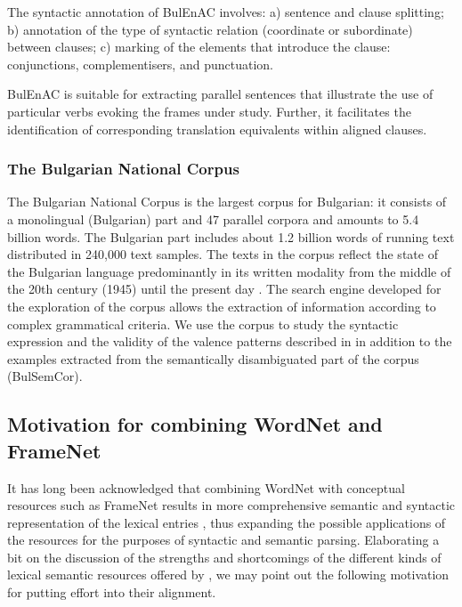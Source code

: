 \documentclass[output=paper,colorlinks,citecolor=brown]{langscibook}
\begin{document}
The syntactic annotation of BulEnAC involves:
a) sentence and clause splitting;
b) annotation of the type of syntactic relation (coordinate or subordinate) between clauses;
c) marking of the elements that introduce the clause: conjunctions, complementisers, and punctuation.

BulEnAC is suitable for extracting parallel sentences that illustrate the use of particular verbs evoking the frames under study. Further, it facilitates the identification of corresponding translation equivalents within aligned clauses.

\subsubsection{The Bulgarian National Corpus}

The Bulgarian National Corpus is the largest corpus for Bulgarian: it consists of a monolingual (Bulgarian) part and 47 parallel corpora and amounts to 5.4 billion words. The Bulgarian part includes about 1.2 billion words of running text distributed in 240,000 text samples. The texts in the corpus reflect the state of the Bulgarian language predominantly in its written modality from the middle of the 20th century (1945) until the present day  \citep{Koeva2012}. The search engine developed for the exploration of the corpus allows the extraction of information according to complex grammatical criteria. We use the corpus to study the syntactic expression and the validity of the valence patterns described in  in addition to the examples extracted from the semantically disambiguated part of the corpus (BulSemCor).

\subsection{Motivation for combining WordNet and FrameNet}

It has long been acknowledged that combining WordNet with conceptual resources such as FrameNet results in more comprehensive semantic and syntactic representation of the lexical entries \citep{Baker2009,Schneider2012,das-etal-2014-frame}, thus expanding the possible applications of the resources for the purposes of syntactic and semantic parsing. Elaborating a bit on the discussion of the strengths and shortcomings of the different kinds of lexical semantic resources offered by \citet{Shi2005}, we may point out the following motivation for putting effort into their alignment. 
\end{document}
